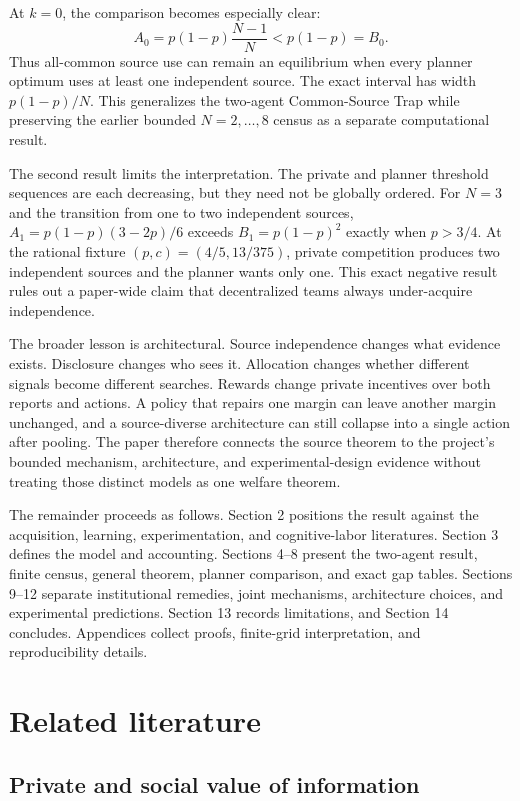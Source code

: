 \documentclass[11pt]{article}
\begin{document}
At $k=0$, the comparison becomes especially clear:
\[
 A_0=p(1-p)\frac{N-1}{N}<p(1-p)=B_0.
\]
Thus all-common source use can remain an equilibrium when every planner optimum
uses at least one independent source. The exact interval has width
$p(1-p)/N$. This generalizes the two-agent Common-Source Trap while preserving
the earlier bounded $N=2,\ldots,8$ census as a separate computational result.

The second result limits the interpretation. The private and planner threshold
sequences are each decreasing, but they need not be globally ordered. For
$N=3$ and the transition from one to two independent sources,
$A_1=p(1-p)(3-2p)/6$ exceeds $B_1=p(1-p)^2$ exactly when $p>3/4$. At the
rational fixture $(p,c)=(4/5,13/375)$, private competition produces two
independent sources and the planner wants only one. This exact negative result
rules out a paper-wide claim that decentralized teams always under-acquire
independence.

The broader lesson is architectural. Source independence changes what evidence
exists. Disclosure changes who sees it. Allocation changes whether different
signals become different searches. Rewards change private incentives over both
reports and actions. A policy that repairs one margin can leave another margin
unchanged, and a source-diverse architecture can still collapse into a single
action after pooling. The paper therefore connects the source theorem to the
project's bounded mechanism, architecture, and experimental-design evidence
without treating those distinct models as one welfare theorem.



The remainder proceeds as follows. Section 2 positions the result against the
acquisition, learning, experimentation, and cognitive-labor literatures. Section
3 defines the model and accounting. Sections 4--8 present the two-agent result,
finite census, general theorem, planner comparison, and exact gap tables.
Sections 9--12 separate institutional remedies, joint mechanisms, architecture
choices, and experimental predictions. Section 13 records limitations, and
Section 14 concludes. Appendices collect proofs, finite-grid interpretation, and
reproducibility details.

\section{Related literature}

\subsection{Private and social value of information}
\end{document}
